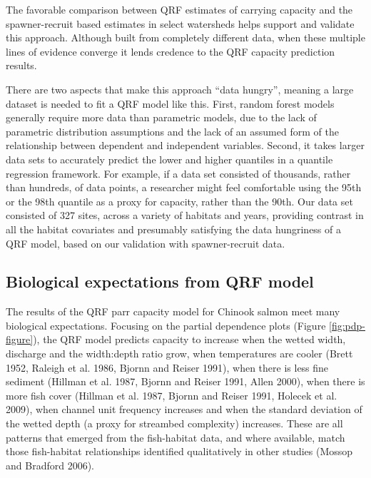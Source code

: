 \documentclass[
  12pt,
]{article}
\begin{document}
The favorable comparison between QRF estimates of carrying capacity and the spawner-recruit based estimates in select watersheds helps support and validate this approach. Although built from completely different data, when these multiple lines of evidence converge it lends credence to the QRF capacity prediction results.

There are two aspects that make this approach ``data hungry'', meaning a large dataset is needed to fit a QRF model like this. First, random forest models generally require more data than parametric models, due to the lack of parametric distribution assumptions and the lack of an assumed form of the relationship between dependent and independent variables. Second, it takes larger data sets to accurately predict the lower and higher quantiles in a quantile regression framework. For example, if a data set consisted of thousands, rather than hundreds, of data points, a researcher might feel comfortable using the 95th or the 98th quantile as a proxy for capacity, rather than the 90th. Our data set consisted of 327 sites, across a variety of habitats and years, providing contrast in all the habitat covariates and presumably satisfying the data hungriness of a QRF model, based on our validation with spawner-recruit data.

\hypertarget{biological-expectations-from-qrf-model}{%
\subsection{Biological expectations from QRF model}\label{biological-expectations-from-qrf-model}}

The results of the QRF parr capacity model for Chinook salmon meet many biological expectations. Focusing on the partial dependence plots (Figure \ref{fig:pdp-figure}), the QRF model predicts capacity to increase when the wetted width, discharge and the width:depth ratio grow, when temperatures are cooler (Brett 1952, Raleigh et al. 1986, Bjornn and Reiser 1991), when there is less fine sediment (Hillman et al. 1987, Bjornn and Reiser 1991, Allen 2000), when there is more fish cover (Hillman et al. 1987, Bjornn and Reiser 1991, Holecek et al. 2009), when channel unit frequency increases and when the standard deviation of the wetted depth (a proxy for streambed complexity) increases. These are all patterns that emerged from the fish-habitat data, and where available, match those fish-habitat relationships identified qualitatively in other studies (Mossop and Bradford 2006).
\end{document}
